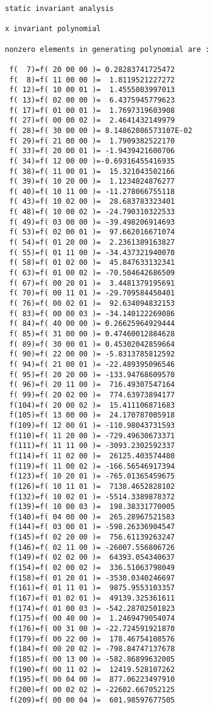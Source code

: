 \begin{footnotesize}
\begin{verbatim}
static invariant analysis

x invariant polynomial

nonzero elements in generating polynomial are :

 f(  7)=f( 20 00 00 )= 0.28283741725472
 f(  8)=f( 11 00 00 )=  1.8119521227272
 f( 12)=f( 10 00 01 )=  1.4555083997013
 f( 13)=f( 02 00 00 )=  6.4375945779623
 f( 17)=f( 01 00 01 )=  1.7697319603908
 f( 27)=f( 00 00 02 )=  2.4641432149979
 f( 28)=f( 30 00 00 )= 8.14862086573107E-02
 f( 29)=f( 21 00 00 )=  1.7909382522170
 f( 33)=f( 20 00 01 )= -1.9439421600706
 f( 34)=f( 12 00 00 )=-0.69316455416935
 f( 38)=f( 11 00 01 )=  15.321043502166
 f( 39)=f( 10 20 00 )=  1.1234824876277
 f( 40)=f( 10 11 00 )= -11.278066755118
 f( 43)=f( 10 02 00 )=  28.683783323401
 f( 48)=f( 10 00 02 )= -24.790310322533
 f( 49)=f( 03 00 00 )= -39.498206914693
 f( 53)=f( 02 00 01 )=  97.662016671074
 f( 54)=f( 01 20 00 )=  2.2361389163827
 f( 55)=f( 01 11 00 )= -34.437321940070
 f( 58)=f( 01 02 00 )=  45.847633132341
 f( 63)=f( 01 00 02 )= -70.504642686509
 f( 67)=f( 00 20 01 )=  3.4481379195691
 f( 70)=f( 00 11 01 )= -29.709584450401
 f( 76)=f( 00 02 01 )=  92.634094832153
 f( 83)=f( 00 00 03 )= -34.140122269086
 f( 84)=f( 40 00 00 )= 0.26625964929444
 f( 85)=f( 31 00 00 )= 0.47460012884628
 f( 89)=f( 30 00 01 )= 0.45302042859664
 f( 90)=f( 22 00 00 )= -5.8313785812592
 f( 94)=f( 21 00 01 )= -22.489395096546
 f( 95)=f( 20 20 00 )= -133.94768609570
 f( 96)=f( 20 11 00 )=  716.49307547164
 f( 99)=f( 20 02 00 )=  774.63973894177
 f(104)=f( 20 00 02 )=  15.411106871683
 f(105)=f( 13 00 00 )=  24.170787005918
 f(109)=f( 12 00 01 )= -110.98043731593
 f(110)=f( 11 20 00 )= -729.49630673371
 f(111)=f( 11 11 00 )= -3093.2302592337
 f(114)=f( 11 02 00 )=  26125.403574480
 f(119)=f( 11 00 02 )= -166.56546917394
 f(123)=f( 10 20 01 )= -765.01365459675
 f(126)=f( 10 11 01 )=  7138.4652828102
 f(132)=f( 10 02 01 )= -5514.3389878372
 f(139)=f( 10 00 03 )=  198.38331770005
 f(140)=f( 04 00 00 )=  265.28967521583
 f(144)=f( 03 00 01 )= -598.26336904547
 f(145)=f( 02 20 00 )=  756.61139263247
 f(146)=f( 02 11 00 )= -26007.556806726
 f(149)=f( 02 02 00 )=  64393.054340637
 f(154)=f( 02 00 02 )=  336.51063798049
 f(158)=f( 01 20 01 )= -3530.0340246697
 f(161)=f( 01 11 01 )=  9875.9553103357
 f(167)=f( 01 02 01 )=  49139.325361611
 f(174)=f( 01 00 03 )= -542.28702501823
 f(175)=f( 00 40 00 )=  1.2469479054074
 f(176)=f( 00 31 00 )= -22.724591921870
 f(179)=f( 00 22 00 )=  178.46754108576
 f(184)=f( 00 20 02 )= -798.84747137678
 f(185)=f( 00 13 00 )= -582.86899632005
 f(190)=f( 00 11 02 )=  12419.528107262
 f(195)=f( 00 04 00 )=  877.06223497910
 f(200)=f( 00 02 02 )= -22602.667052125
 f(209)=f( 00 00 04 )=  601.98597677505


\end{verbatim}
\end{footnotesize}
